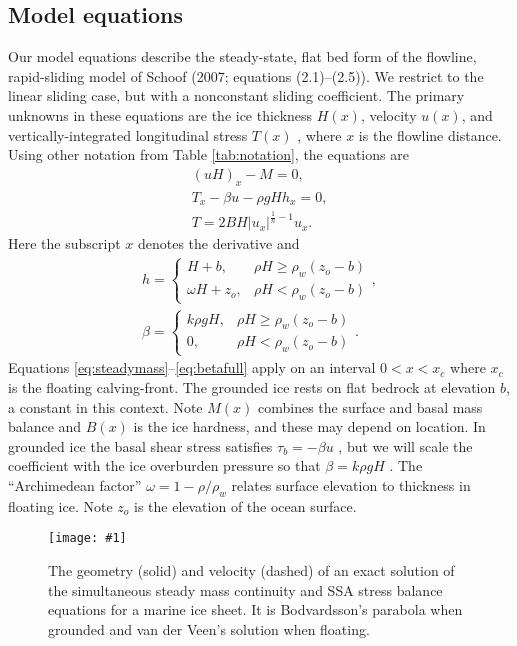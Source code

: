 \documentclass[review,letterpaper]{igs}
\newcommand{\onecol}[1]{\texttt{[image: \#1]}}
\begin{document}
\subsection*{Model equations}  Our model equations describe the steady-state, flat bed form of the flowline, rapid-sliding model of Schoof\nocite{SchoofMarine1} (2007; equations (2.1)--(2.5)).  We restrict to the linear sliding case, but with a nonconstant sliding coefficient.  The primary unknowns in these equations are the ice thickness $H(x)$, velocity $u(x)$, and vertically-integrated longitudinal stress $T(x)$ \citep{SchoofStream}, where $x$ is the flowline distance.  Using other notation from Table \ref{tab:notation}, the equations are
\begin{gather}
(uH)_x - M = 0, \label{eq:steadymass} \\
T_x - \beta u - \rho g H h_x = 0, \label{eq:steadySSA} \\
T = 2 B H |u_x|^{\frac{1}{n}-1} u_x. \label{eq:Tstress}
\end{gather}
Here the subscript $x$ denotes the derivative and
\begin{gather}
h = \begin{cases} H+b,            & \rho H \ge \rho_w (z_o - b) \\
                  \omega H + z_o, & \rho H < \rho_w (z_o - b) \end{cases}, \label{eq:surface} \\
\beta = \begin{cases} k \rho g H,    & \rho H \ge \rho_w (z_o - b) \\
                      0,          & \rho H < \rho_w (z_o - b) \end{cases}. \label{eq:betafull}
\end{gather}
Equations \eqref{eq:steadymass}--\eqref{eq:betafull} apply on an interval $0 < x < x_c$ where $x_c$ is the floating calving-front.  The grounded ice rests on flat bedrock at elevation $b$, a constant in this context.  Note $M(x)$ combines the surface and basal mass balance and $B(x)$ is the ice hardness, and these may depend on location.  In grounded ice the basal shear stress satisfies $\tau_b = - \beta u$ \citep{MacAyeal}, but we will scale the coefficient with the ice overburden pressure so that $\beta = k \rho g H$ \citep{Bodvardsson}.  The ``Archimedean factor'' $\omega = 1 - \rho/\rho_w$ relates surface elevation to thickness in floating ice.  Note $z_o$ is the elevation of the ocean surface.

\begin{figure}[ht]
\onecol{exactmarine-geometry}
\caption{The geometry (solid) and velocity (dashed) of an exact solution of the simultaneous steady mass continuity and SSA stress balance equations for a marine ice sheet.  It is Bodvardsson's parabola when grounded and van der Veen's solution when floating.} \label{fig:exactmarine}
\end{figure}
\end{document}
